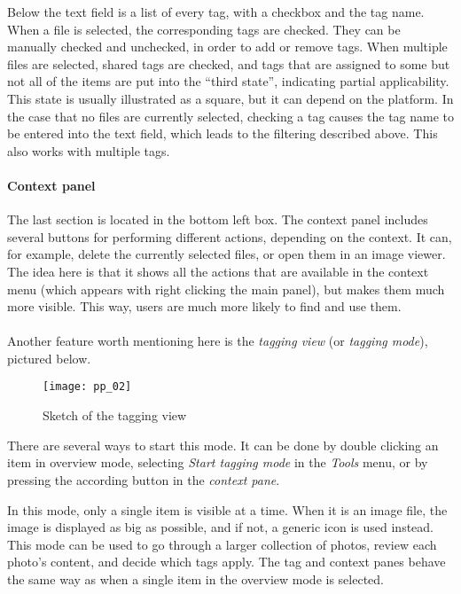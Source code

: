 Below the text field is a list of every tag, with a checkbox and the tag name.
When a file is selected, the corresponding tags are checked. They can be
manually checked and unchecked, in order to add or remove tags. When multiple
files are selected, shared tags are checked, and tags that are assigned to some
but not all of the items are put into the ``third state'', indicating partial
applicability. This state is usually illustrated as a square, but it can depend
on the platform. In the case that no files are currently selected, checking a
tag causes the tag name to be entered into the text field, which leads to the
filtering described above. This also works with multiple tags.

\paragraph{Context panel} The last section is located in the bottom left box.
The context panel includes several buttons for performing different actions,
depending on the context. It can, for example, delete the currently selected
files, or open them in an image viewer. The idea here is that it shows all the
actions that are available in the context menu (which appears with right
clicking the main panel), but makes them much more visible. This way, users are
much more likely to find and use them.

\paragraph{}
Another feature worth mentioning here is the \emph{tagging view} (or
\emph{tagging mode}), pictured below.

\begin{figure}[H]
	\centering
	\texttt{[image: pp\_02]}
	\caption{Sketch of the tagging view}
\end{figure}

There are several ways to start this mode. It can be done by double clicking
an item in overview mode, selecting \emph{Start tagging mode} in the
\emph{Tools} menu, or by pressing the according button in the \emph{context pane}.

In this mode, only a single item is visible at a time.
When it is an image file, the image is displayed as big as
possible, and if not, a generic icon is used instead. This mode can be used to
go through a larger collection of photos, review each photo's content, and
decide which tags apply. The tag and context panes behave the same way as
when a single item in the overview mode is selected.


